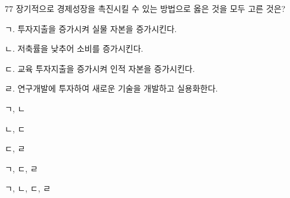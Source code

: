 \begin{question}{77}
장기적으로 경제성장을 촉진시킬 수 있는 방법으로 옳은 것을 모두 고른 것은?
\begin{framedtext}
ㄱ. 투자지출을 증가시켜 실물 자본을 증가시킨다. \par
ㄴ. 저축률을 낮추어 소비를 증가시킨다. \par
ㄷ. 교육 투자지출을 증가시켜 인적 자본을 증가시킨다. \par
ㄹ. 연구개발에 투자하여 새로운 기술을 개발하고 실용화한다. \par
\end{framedtext}
\begin{choices}
  \item ㄱ, ㄴ
  \item ㄴ, ㄷ
  \item ㄷ, ㄹ
  \item ㄱ, ㄷ, ㄹ
  \item ㄱ, ㄴ, ㄷ, ㄹ
\end{choices}
\end{question}
